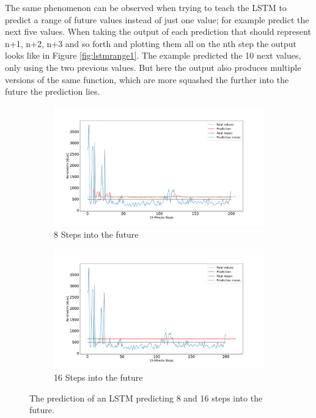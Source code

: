 The same phenomenon can be observed when trying to teach the LSTM to predict a range of future values instead of just one value; for example predict the next five values.
When taking the output of each prediction that should represent n+1, n+2, n+3 and so forth and plotting them all on the nth step the output looks like in Figure \ref{fig:lstmrange1}.
The example predicted the 10 next values, only using the two previous values.
But here the output also produces multiple versions of the same function, which are more squashed the further into the future the prediction lies.
\begin{figure}
	\centering
	\begin{subfigure}{1\linewidth}
		\centering
		\includegraphics[width=1\linewidth]{Pictures/BigStep/LSTM_Big_Step_81}
		\caption{8 Steps into the future}
		\label{fig:bigStep8}
	\end{subfigure}
	\begin{subfigure}{1\linewidth}
		\centering
		\includegraphics[width=1\linewidth]{Pictures/BigStep/LSTM_Big_Step_161}
		\caption{16 Steps into the future}
		\label{fig:bigStep16}
	\end{subfigure}
	\caption{The prediction of an LSTM predicting 8 and 16 steps into the future.}
	\label{fig:bigStep1}
\end{figure}

